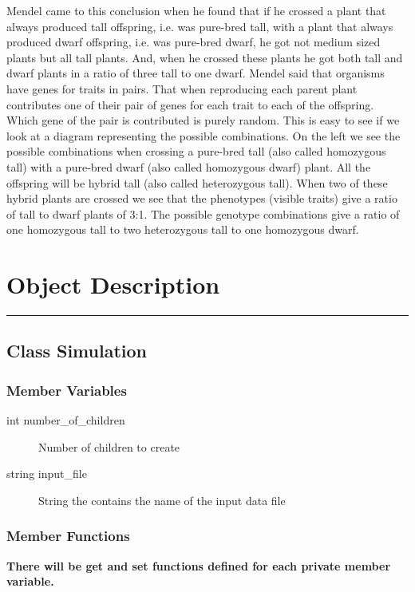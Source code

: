 \documentclass{article}
\begin{document}
Mendel came to this conclusion when he found that if he crossed a plant that always produced tall offspring, i.e. was pure-bred tall, with a plant that always produced dwarf offspring, i.e. was pure-bred dwarf, he got not medium sized plants but all tall plants. And, when he crossed these plants he got both tall and dwarf plants in a ratio of three tall to one dwarf. Mendel said that organisms have genes for traits in pairs. That when reproducing each parent plant contributes one of their pair of genes for each trait to each of the offspring. Which gene of the pair is contributed is purely random. This is easy to see if we look at a diagram representing the possible combinations. On the left we see the possible combinations when crossing a pure-bred tall (also called homozygous tall) with a pure-bred dwarf (also called homozygous dwarf) plant. All the offspring will be hybrid tall (also called heterozygous tall). When two of these hybrid plants are crossed we see that the phenotypes (visible traits) give a ratio of tall to dwarf plants of 3:1. The possible genotype combinations give a ratio of one homozygous tall to two heterozygous tall to one homozygous dwarf.




\newpage

\section{Object Description}
\hrule
\subsection{Class Simulation}
\subsubsection{Member Variables}
\begin{description}
\item[int number\_of\_children] Number of children to create
\item[string input\_file] String the contains the name of the input data file
\end{description}
\subsubsection{Member Functions}
\textbf{There will be get and set functions defined for each private member variable.}
\end{document}

